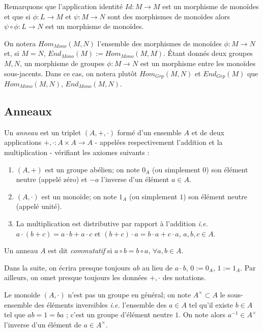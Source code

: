 Remarquons que l'application identité $Id:M\rightarrow M$ est un morphisme de
monoïdes et que si $\phi:L\rightarrow M$ et $\psi:M\rightarrow N$ sont des
morphismes de monoïdes alors $\psi\circ \phi:L\rightarrow N$ est un morphisme
de monoïdes.

On notera $Hom_{Mono}(M,N)$ l'ensemble des morphismes de monoïdes
$\phi:M\rightarrow N$ et, si $M=N$, $End_{Mono}(M):=Hom_{Mono}(M,M)$. Étant
donnés deux groupes $M,N$, un morphisme de groupes $\phi:M\rightarrow N$ est un
morphisme entre les monoïdes sous-jacents. Dans ce cas, on notera plutôt
$Hom_{Grp}(M,N)$ et $End_{Grp}(M)$ que $Hom_{Mono}(M,N)$, $End_{Mono}(M,N)$.

\subsection{Anneaux}

\begin{definition}
    Un \emph{anneau} est  un triplet $(A,+,\cdot)$ formé d'un
    ensemble $A$ et de deux applications $+,\cdot :A\times A\rightarrow A$ -
    appelées respectivement l'addition et la multiplication -  vérifiant les
    axiomes suivants :

    \begin{enumerate}
        \item $(A,+)$ est un groupe abélien; on note $0_A$ (ou simplement $0$)
            son élément neutre (appelé zéro) et $-a$ l'inverse d'un élément
            $a\in A$.
        \item $(A ,\cdot)$ est un monoïde; on note $1_A$ (ou simplement $1$)
            son élément neutre (appelé unité). 
        \item La multiplication est distributive par rapport à l'addition
            \textit{i.e.} $a\cdot (b+c)=a\cdot b+a\cdot c$ et $(b+c)\cdot
            a=b\cdot a+c\cdot a$, $a,b,c\in A$.
    \end{enumerate}
\end{definition}

Un anneau $A$ est dit \emph{commutatif} si $a\circ b=b\circ a$, $\forall a,b\in
A$.

\begin{remarque}
    Dans la suite, on écrira presque toujours $ab$ au lieu de $a\cdot b$,
    $0:=0_A$, $1:=1_A$. Par ailleurs, on omet presque toujours les données
    $+,\cdot$ des notations.
\end{remarque}

Le monoïde $(A ,\cdot)$ n'est pas un groupe en général; on note
$A^\times\subset A $ le sous-ensemble des éléments inversibles \textit{i.e.}
l'ensemble des $ a\in A$ tel qu'il existe $b\in A$ tel que $ab=1=ba$ ; c'est un
groupe d'élément neutre $1$. On note alors $a^{-1}\in A^\times$ l'inverse d'un
élément de $a\in A^\times$.


